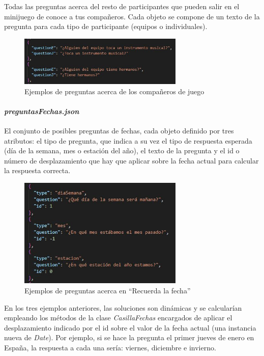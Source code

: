 Todas las preguntas acerca del resto de participantes que pueden salir en el minijuego de conoce a tus compañeros. Cada objeto se compone de un texto de la pregunta para cada tipo de participante (equipos o individuales).

\begin{figure}[H]
	\centering
	\includegraphics[width=0.7\textwidth]{imgs/exp-compas.jpg}
	\caption{Ejemplos de preguntas acerca de los compañeros de juego}
	\label{fig:exp-compas}
\end{figure}

\paragraph{\textit{preguntasFechas.json}}

El conjunto de posibles preguntas de fechas, cada objeto definido por tres atributos: el tipo de pregunta, que indica a su vez el tipo de respuesta esperada (día de la semana, mes o estación del año), el texto de la pregunta y el id o número de desplazamiento que hay que aplicar sobre la fecha actual para calcular la respuesta correcta.

\begin{figure}[H]
	\centering
	\includegraphics[width=0.7\textwidth]{imgs/exp-fechas.jpg}
	\caption{Ejemplos de preguntas acerca en \enquote{Recuerda la fecha}}
	\label{fig:exp-fechas}
\end{figure}

En los tres ejemplos anteriores, las soluciones son dinámicas y se calcularían empleando los métodos de la clase \textit{CasillaFechas} encargados de aplicar el desplazamiento indicado por el id sobre el valor de la fecha actual (una instancia nueva de \textit{Date}). Por ejemplo, si se hace la pregunta el primer jueves de enero en España, la respuesta a cada una sería: viernes, diciembre e invierno.

